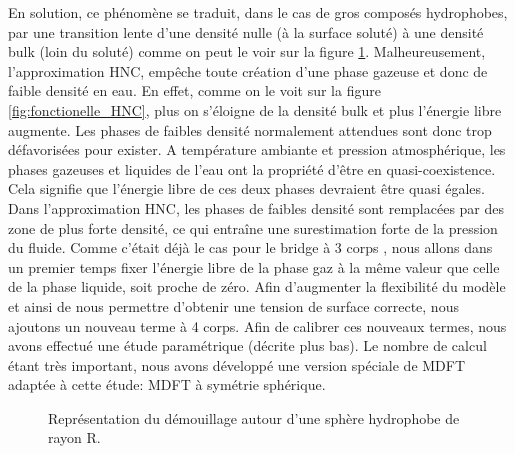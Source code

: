 En solution, ce phénomène se traduit, dans le cas de gros composés hydrophobes, par une transition lente d'une densité nulle (à la surface soluté) à une densité bulk (loin du soluté) comme on peut le voir sur la figure \ref{fig:demouillage}. Malheureusement, l'approximation HNC, empêche toute création d'une phase gazeuse et donc de faible densité en eau. En effet, comme on le voit sur la figure \ref{fig:fonctionelle_HNC}, plus on s'éloigne de la densité bulk et plus l'énergie libre augmente. Les phases de faibles densité normalement attendues sont donc trop défavorisées pour exister. A température ambiante et pression atmosphérique, les phases gazeuses et liquides de l'eau ont la propriété d'être en quasi-coexistence. Cela signifie que l'énergie libre de ces deux phases devraient être quasi égales. Dans l'approximation HNC, les phases de faibles densité sont remplacées par des zone de plus forte densité, ce qui entraîne une surestimation forte de la pression du fluide. Comme c'était déjà le cas pour le bridge à 3 corps \cite{jeanmairet_molecular_2013}, nous allons dans un premier temps fixer l'énergie libre de la phase gaz à la même valeur que celle de la phase liquide, soit proche de zéro. Afin d'augmenter la flexibilité du modèle et ainsi de nous permettre d'obtenir une tension de surface correcte, nous ajoutons un nouveau terme à 4 corps. Afin de calibrer ces nouveaux termes, nous avons effectué une étude paramétrique (décrite plus bas). Le nombre de calcul étant très important, nous avons développé une version spéciale de MDFT adaptée à cette étude: MDFT à symétrie sphérique. 







\begin{figure}[H]
    \center    
    \caption[Représentation du démouillage autour d'une sphère hydrophobe.]{Représentation du démouillage autour d'une sphère hydrophobe de rayon R.}
    \label{fig:demouillage}
\end{figure}



